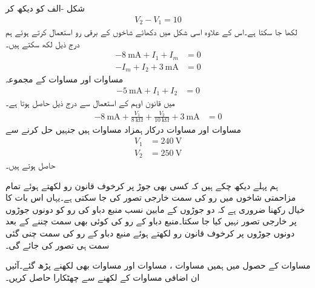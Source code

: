 شکل -الف کو دیکھ کر
\begin{align}\label{مساوات_جوڑ_منبع_دباو_درمیان_جوڑ_الف}
V_2-V_1=10
\end{align}
لکھا جا سکتا ہے۔اس کے علاوہ اسی شکل میں دکھائے شاخوں کے برقی رو استعمال کرتے ہوئے ہم درج ذیل لکھ سکتے ہیں۔
\begin{align}
-\SI{8}{\milli\ampere}+I_1+I_m&=0 \label{مساوات_جوڑ_منبع_دباو_درمیان_جوڑ_ب}\\
-I_m+I_2+\SI{3}{\milli\ampere}&=0 \label{مساوات_جوڑ_منبع_دباو_درمیان_جوڑ_پ}
\end{align}
مساوات  اور مساوات  کے مجموعہ
\begin{align}\label{مساوات_جوڑ_منبع_دباو_درمیان_جوڑ_ت}
-\SI{5}{\milli\ampere}+I_1+I_2&=0
\end{align}
میں قانون اوہم کے استعمال سے درج ذیل حاصل ہوتا ہے۔
\begin{align}\label{مساوات_جوڑ_منبع_دباو_درمیان_جوڑ_ٹ}
-\SI{8}{\milli\ampere}+\frac{V_1}{\SI{8}{\kilo\ohm}}+\frac{V_2}{\SI{10}{\kilo\ohm}}+\SI{3}{\milli\ampere}&=0
\end{align}
مساوات  اور مساوات  درکار ہمزاد مساوات ہیں جنہیں حل کرنے سے
\begin{align*}
V_1&=\SI{240}{\volt}\\
V_2&=\SI{250}{\volt}
\end{align*}
حاصل ہوتے ہیں۔

ہم پہلے دیکھ چکے ہیں کہ کسی بھی جوڑ پر کرخوف قانون رو لکھتے ہوئے تمام مزاحمتی شاخوں میں رو کی سمت خارجی تصور کی جا سکتی ہے۔یہاں اس بات کا خیال رکھنا ضروری ہے کہ دو جوڑوں کے مابین نسب منبع دباو کی رو کو دونوں جوڑوں پر خارجی تصور نہیں کیا جا سکتا۔منبع دباو کے رو کی کوئی بھی سمت چننے کے بعد دونوں جوڑوں پر کرخوف قانون رو لکھتے ہوئے  منبع دباو کے رو کی  سمت چنی گئی سمت ہی تصور کی جائے گی۔

 مساوات  کے حصول میں ہمیں مساوات ، مساوات  اور مساوات  بھی لکھنے پڑھ گئے۔آئیں ان اضافی مساوات کے لکھنے سے چھٹکارا حاصل کریں۔

